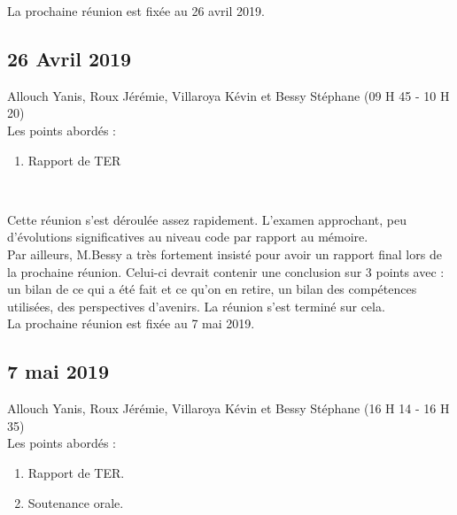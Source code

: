 \documentclass[11pt,a4paper]{article}
\begin{document}
    La prochaine réunion est fixée au 26 avril 2019.
    
    
\newpage

\subsection{26 Avril 2019}
Allouch Yanis, Roux Jérémie, Villaroya Kévin et Bessy Stéphane (09 H 45 - 10 H 20)\\

Les points abordés :
\begin{enumerate}
    \item Rapport de TER
\end{enumerate}

\begin{tabular}{c}
    \hline
\end{tabular}\\
    
    Cette réunion s'est déroulée assez rapidement. L'examen approchant, peu d'évolutions significatives au niveau code par rapport au mémoire.\\
    
    Par ailleurs, M.Bessy a très fortement insisté pour avoir un rapport final lors de la prochaine réunion. Celui-ci devrait contenir une conclusion sur 3 points avec : un bilan de ce qui a été fait et ce qu'on en retire, un bilan des compétences utilisées, des perspectives d'avenirs. La réunion s'est terminé sur cela.\\
    
    La prochaine réunion est fixée au 7 mai 2019.

    
\newpage

\subsection{7 mai 2019}
Allouch Yanis, Roux Jérémie, Villaroya Kévin et Bessy Stéphane (16 H 14 - 16 H 35)\\

Les points abordés :
\begin{enumerate}
    \item Rapport de TER.
    \item Soutenance orale.
\end{enumerate}

\begin{tabular}{c}
    \hline
\end{tabular}\\
    
\end{document}
